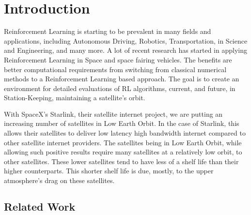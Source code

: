 \chapter{Introduction}\label{ch:intro}

Reinforcement Learning is starting to be prevalent in many fields and applications, including Autonomous Driving, Robotics, Transportation, in Science and Engineering, and many more. A lot of recent research has started in applying Reinforcement Learning in Space and space fairing vehicles. The benefits are better computational requirements from switching from classical numerical methods to a Reinforcement Learning based approach. The goal is to create an environment for detailed evaluations of RL algorithms, current, and future, in Station-Keeping, maintaining a satellite's orbit.

With SpaceX's Starlink, their satellite internet project, we are putting an increasing number of satellites in Low Earth Orbit. In the case of Starlink, this allows their satellites to deliver low latency high bandwidth internet compared to other satellite internet providers. The satellites being in Low Earth Orbit, while allowing such positive results require many satellites at a relatively low orbit, to other satellites. These lower satellites tend to have less of a shelf life than their higher counterparts. This shorter shelf life is due, mostly, to the upper atmosphere's drag on these satellites.

\section{Related Work}
